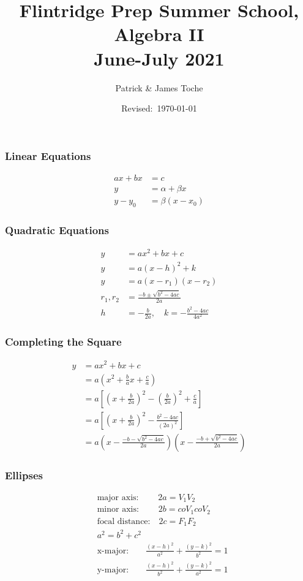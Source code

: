 \documentclass[12pt]{article}
\title{Flintridge Prep Summer School, Algebra II \\ June-July 2021}
\author{Patrick \& James Toche}
\date{Revised:~\today}
\begin{document}
\subsubsection*{Linear Equations}
\begin{align*}
  ax + bx & = c \\
        y & = \alpha + \beta x \\
y - y_{0} & = \beta (x - x_{0})
\end{align*} 

\subsubsection*{Quadratic Equations}
\begin{align*}
y & = a x^2 + b x + c \\
y & = a (x-h)^2 + k \\
y & = a (x-r_{1}) (x-r_{2}) \\[1ex]
r_{1}, r_{2}
  & = \frac{-b \pm \sqrt{b^2 - 4ac}}{2a} \\
h & = - \frac{b}{2a}, \quad k = - \frac{b^2-4ac}{4a^2}
\end{align*} 

\subsubsection*{Completing the Square}
\begin{align*}
y & = a x^2 + b x + c \\
  & = a \left(x^2 + \frac{b}{a} x +  \frac{c}{a}\right) \\[1ex]
  & = a \left[\left(x + \frac{b}{2a}\right)^2 - \left(\frac{b}{2a}\right)^2  + \frac{c}{a}\right] \\[1ex] 
  & = a \left[\left(x + \frac{b}{2a}\right)^2 - \frac{b^2-4ac}{(2a)^2}\right] \\[1ex] 
  & = a \left(x-\frac{-b - \sqrt{b^2 - 4ac}}{2a}\right) \left(x-\frac{-b + \sqrt{b^2 - 4ac}}{2a}\right)
\end{align*}

\subsubsection*{Ellipses}
\begin{align*}
& \text{major axis:} \;\qquad 2a = V_{1}V_{2} \\
& \text{minor axis:} \;\qquad 2b = coV_{1}coV_{2}\\
& \text{focal distance:} \quad 2c = F_{1}F_{2}\\
& a^2 = b^2 + c^2 \\
& \text{x-major:}\qquad \frac{(x-h)^2}{a^2} + \frac{(y-k)^2}{b^2} = 1 \\
& \text{y-major:}\qquad \frac{(x-h)^2}{b^2} + \frac{(y-k)^2}{a^2} = 1 
\end{align*}
\end{document}

